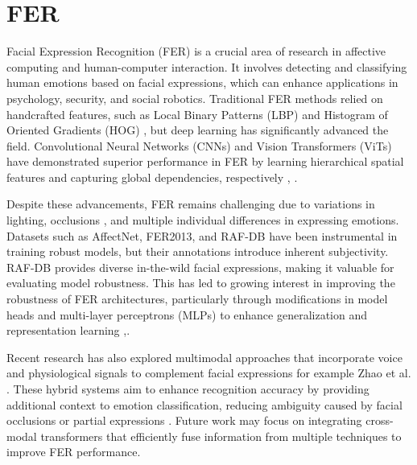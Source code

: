%



\section{FER}

Facial Expression Recognition (\gls{FER}) is a crucial area of research in affective computing and human-computer interaction. It involves detecting and classifying human emotions based on facial expressions, which can enhance applications in psychology, security, and social robotics. Traditional FER methods relied on handcrafted features, such as Local Binary Patterns (LBP) \cite{el_moussati_local_2020} and Histogram of Oriented Gradients (HOG) \cite{carcagni_facial_2015}, but deep learning has significantly advanced the field. Convolutional Neural Networks (CNNs) and Vision Transformers (ViTs) have demonstrated superior performance in FER by learning hierarchical spatial features and capturing global dependencies, respectively  \cite{zheng_poster_2022}, \cite{kollias_affect_2021}. 



Despite these advancements, FER remains challenging due to variations in lighting, occlusions \cite{guo_occrob_2023}, and multiple individual differences in expressing emotions. Datasets such as AffectNet, FER2013, and RAF-DB have been instrumental in training robust models, but their annotations introduce inherent subjectivity. RAF-DB provides diverse \gls{in-the-wild} facial expressions, making it valuable for evaluating model robustness. This has led to growing interest in improving the robustness of FER architectures, particularly through modifications in model heads and multi-layer perceptrons (MLPs) to enhance generalization and representation learning \cite{abdullah_activator_2024},\cite{yu_rethinking_2021}. 

Recent research has also explored multimodal approaches that incorporate voice and physiological signals to complement facial expressions for example Zhao et al. \cite{zhao_former-dfer_2021}. These hybrid systems aim to enhance recognition accuracy by providing additional context to emotion classification, reducing ambiguity caused by facial occlusions or partial expressions \cite{wang_survey_2024}. Future work may focus on integrating cross-modal transformers that efficiently fuse information from multiple techniques to improve FER performance. 

